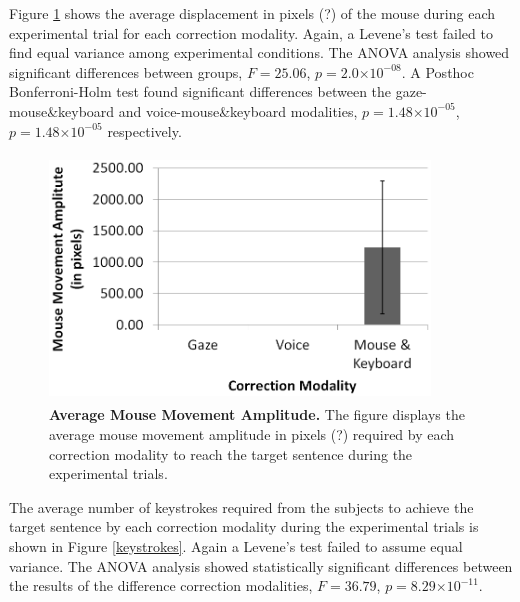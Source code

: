 \documentclass[]{article}
\providecommand{\e}[1]{\ensuremath{\times 10^{#1}}}
\begin{document}
Figure \ref{mouseDisplacement} shows the average displacement in pixels (?) of the mouse during each experimental trial
for each correction modality. Again, a Levene's test failed to find equal variance among experimental conditions. The ANOVA
analysis showed significant differences between groups,  $F=25.06$, $p=2.0\e{-08}$. A Posthoc Bonferroni-Holm test
found significant differences between the gaze-mouse\&keyboard and voice-mouse\&keyboard modalities,  $p=1.48\e{-05}$,
$p=1.48\e{-05}$ respectively.


\begin{figure}[ht]
\begin{center}
\vspace{-3mm}
\includegraphics[width=0.9\textwidth,height=65mm]{figures/mouseDisplacement.png}
\end{center}
\caption{\textbf{Average Mouse Movement Amplitude.} The figure displays the average mouse movement amplitude in pixels
(?) required by each correction modality to reach the target sentence during the experimental trials.}
\label{mouseDisplacement}
\end{figure}

The average number of keystrokes required from the subjects to achieve the target sentence by each correction modality
during the experimental trials is shown in Figure \ref{keystrokes}. Again a Levene's test failed to assume equal
variance. The ANOVA analysis showed statistically significant differences between the results of the
difference correction modalities, $F=36.79$, $p=8.29\e{-11}$. 
\end{document}
